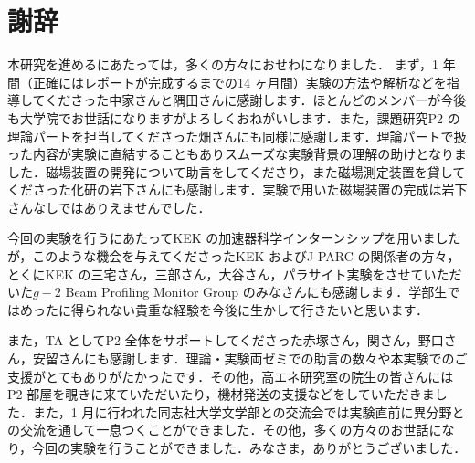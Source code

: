 \section*{謝辞}

本研究を進めるにあたっては，多くの方々におせわになりました．
まず，1 年間（正確にはレポートが完成するまでの14 ヶ月間）実験の方法や解析などを指導してくださった中家さんと隅田さんに感謝します．ほとんどのメンバーが今後も大学院でお世話になりますがよろしくおねがいします．また，課題研究P2 の理論パートを担当してくださった畑さんにも同様に感謝します．理論パートで扱った内容が実験に直結することもありスムーズな実験背景の理解の助けとなりました．磁場装置の開発について助言をしてくださり，また磁場測定装置を貸してくださった化研の岩下さんにも感謝します．実験で用いた磁場装置の完成は岩下さんなしではありえませんでした．

今回の実験を行うにあたってKEK の加速器科学インターンシップを用いましたが，このような機会を与えてくださったKEK およびJ-PARC の関係者の方々，とくにKEK の三宅さん，三部さん，大谷さん，パラサイト実験をさせていただいた$g-2$ Beam Profiling Monitor Group のみなさんにも感謝します．学部生ではめったに得られない貴重な経験を今後に生かして行きたいと思います．

また，TA としてP2 全体をサポートしてくださった赤塚さん，関さん，野口さん，安留さんにも感謝します．理論・実験両ゼミでの助言の数々や本実験でのご支援がとてもありがたかったです．その他，高エネ研究室の院生の皆さんにはP2 部屋を覗きに来ていただいたり，機材発送の支援などをしていただきました．また，1 月に行われた同志社大学文学部との交流会では実験直前に異分野との交流を通して一息つくことができました．その他，多くの方々のお世話になり，今回の実験を行うことができました．みなさま，ありがとうございました．